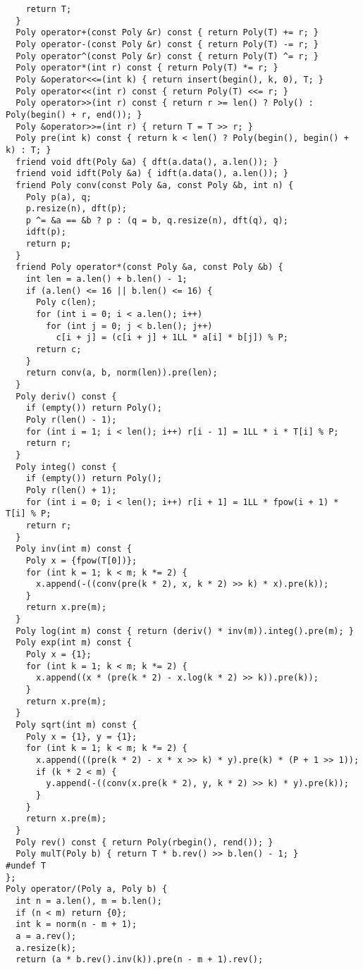 \documentclass[]{article}
\begin{document}
\begin{verbatim}
    return T;
  }
  Poly operator+(const Poly &r) const { return Poly(T) += r; }
  Poly operator-(const Poly &r) const { return Poly(T) -= r; }
  Poly operator^(const Poly &r) const { return Poly(T) ^= r; }
  Poly operator*(int r) const { return Poly(T) *= r; }
  Poly &operator<<=(int k) { return insert(begin(), k, 0), T; }
  Poly operator<<(int r) const { return Poly(T) <<= r; }
  Poly operator>>(int r) const { return r >= len() ? Poly() : Poly(begin() + r, end()); }
  Poly &operator>>=(int r) { return T = T >> r; }
  Poly pre(int k) const { return k < len() ? Poly(begin(), begin() + k) : T; }
  friend void dft(Poly &a) { dft(a.data(), a.len()); }
  friend void idft(Poly &a) { idft(a.data(), a.len()); }
  friend Poly conv(const Poly &a, const Poly &b, int n) {
    Poly p(a), q;
    p.resize(n), dft(p);
    p ^= &a == &b ? p : (q = b, q.resize(n), dft(q), q);
    idft(p);
    return p;
  }
  friend Poly operator*(const Poly &a, const Poly &b) {
    int len = a.len() + b.len() - 1;
    if (a.len() <= 16 || b.len() <= 16) {
      Poly c(len);
      for (int i = 0; i < a.len(); i++)
        for (int j = 0; j < b.len(); j++)
          c[i + j] = (c[i + j] + 1LL * a[i] * b[j]) % P;
      return c;
    }
    return conv(a, b, norm(len)).pre(len);
  }
  Poly deriv() const {
    if (empty()) return Poly();
    Poly r(len() - 1);
    for (int i = 1; i < len(); i++) r[i - 1] = 1LL * i * T[i] % P;
    return r;
  }
  Poly integ() const {
    if (empty()) return Poly();
    Poly r(len() + 1);
    for (int i = 0; i < len(); i++) r[i + 1] = 1LL * fpow(i + 1) * T[i] % P;
    return r;
  }
  Poly inv(int m) const {
    Poly x = {fpow(T[0])};
    for (int k = 1; k < m; k *= 2) {
      x.append(-((conv(pre(k * 2), x, k * 2) >> k) * x).pre(k));
    }
    return x.pre(m);
  }
  Poly log(int m) const { return (deriv() * inv(m)).integ().pre(m); }
  Poly exp(int m) const {
    Poly x = {1};
    for (int k = 1; k < m; k *= 2) {
      x.append((x * (pre(k * 2) - x.log(k * 2) >> k)).pre(k));
    }
    return x.pre(m);
  }
  Poly sqrt(int m) const {
    Poly x = {1}, y = {1};
    for (int k = 1; k < m; k *= 2) {
      x.append(((pre(k * 2) - x * x >> k) * y).pre(k) * (P + 1 >> 1));
      if (k * 2 < m) {
        y.append(-((conv(x.pre(k * 2), y, k * 2) >> k) * y).pre(k));
      }
    }
    return x.pre(m);
  }
  Poly rev() const { return Poly(rbegin(), rend()); }
  Poly mulT(Poly b) { return T * b.rev() >> b.len() - 1; }
#undef T
};
Poly operator/(Poly a, Poly b) {
  int n = a.len(), m = b.len();
  if (n < m) return {0};
  int k = norm(n - m + 1);
  a = a.rev();
  a.resize(k);
  return (a * b.rev().inv(k)).pre(n - m + 1).rev();

\end{verbatim}
\end{document}
